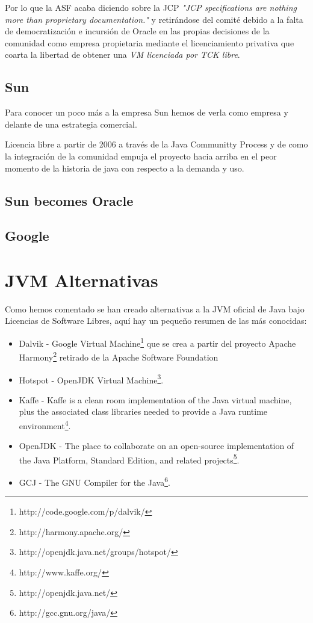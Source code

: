 \documentclass[11pt]{scrartcl}
\begin{document}
Por lo que la ASF acaba diciendo sobre la JCP \emph{"JCP specifications are nothing more than proprietary documentation."} y retirándose del comité debido a la falta de democratización e incursión de Oracle en las propias decisiones de la comunidad como empresa propietaria mediante el licenciamiento privativa que coarta la libertad de obtener una \emph{VM licenciada por TCK libre}.

\subsection{Sun}

Para conocer un poco más a la empresa Sun hemos de verla como empresa y delante de una estrategia comercial.

Licencia libre a partir de 2006 a través de la Java Communitty Process y de como la integración de la comunidad empuja el proyecto hacia arriba en el peor momento de la historia de java con respecto a la demanda y uso.%

\subsection{Sun becomes Oracle}

\subsection{Google}

\section{JVM Alternativas}

Como hemos comentado se han creado alternativas a la JVM oficial de Java bajo Licencias de Software Libres, aquí hay un pequeño resumen de las más conocidas:
\begin{itemize}
    \item Dalvik - Google Virtual Machine\footnote{http://code.google.com/p/dalvik/} que se crea a partir del proyecto Apache Harmony\footnote{http://harmony.apache.org/} retirado de la Apache Software Foundation
    \item Hotspot - OpenJDK Virtual Machine\footnote{http://openjdk.java.net/groups/hotspot/}.
    \item Kaffe - Kaffe is a clean room implementation of the Java virtual machine, plus the associated class libraries needed to provide a Java runtime environment\footnote{http://www.kaffe.org/}.
    \item OpenJDK - The place to collaborate on an open-source implementation of the Java Platform, Standard Edition, and related projects\footnote{http://openjdk.java.net/}.
    \item GCJ - The GNU Compiler for the Java\footnote{http://gcc.gnu.org/java/}.
\end{itemize}
\end{document}
